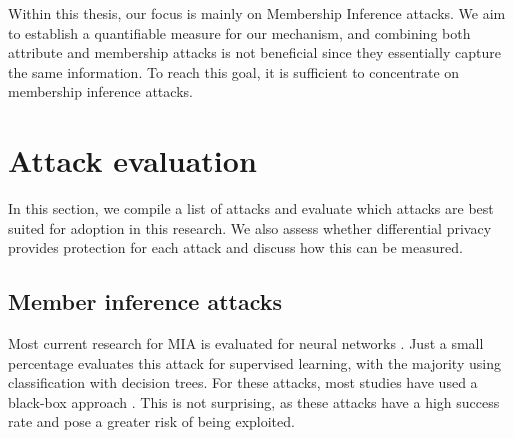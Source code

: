 Within this thesis, our focus is mainly on Membership Inference attacks.
We aim to establish a quantifiable measure for our mechanism, and combining both attribute and membership attacks is not beneficial since they essentially capture the same information.
To reach this goal, it is sufficient to concentrate on membership inference attacks. %
\newpage






\section{Attack evaluation} \label{theory:attack-evaluation}
In this section, we compile a list of attacks and evaluate which attacks are best suited for adoption in this research.
We also assess whether differential privacy provides protection for each attack and discuss how this can be measured.
\subsection{Member inference attacks}
Most current research for MIA is evaluated for neural networks \citep{rigaki_survey_2021}.
Just a small percentage evaluates this attack for supervised learning, with the majority using classification with decision trees.
For these attacks, most studies have used a black-box approach \citep{rigaki_survey_2021}.
This is not surprising, as these attacks have a high success rate and pose a greater risk of being exploited.

